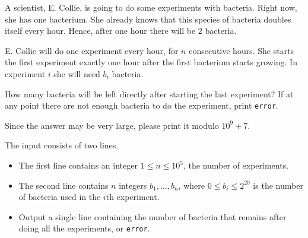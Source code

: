 

\newcommand{\modval}{10^9+7}
\newcommand{\maxn}{10^5}
\newcommand{\maxb}{2^{20}}
\newcommand{\errormessage}{error}

A scientist, E. Collie, is going to do some experiments with bacteria.
Right now, she has one bacterium.
She already knows that this species of bacteria doubles itself every hour.
Hence, after one hour there will be $2$ bacteria.

E. Collie will do one experiment every hour, for $n$ consecutive hours.
She starts the first experiment exactly one hour after the first bacterium starts growing.
In experiment $i$ she will need $b_i$ bacteria.

How many bacteria will be left directly after starting the last experiment?
If at any point there are not enough bacteria to do the experiment, print \texttt{\errormessage}.

Since the answer may be very large, please print it modulo $\modval$.

\begin{Input}
	The input consists of two lines.
	\begin{itemize}
		\item The first line contains an integer $1\leq n\leq \maxn$, the number of experiments.
		\item The second line contains $n$ integers $b_1,\dots,b_n$, where $0\leq b_i\leq \maxb$ is
			the number of bacteria used in the $i$th experiment.
	\end{itemize}
\end{Input}

\begin{Output}
\begin{itemize}\item
	Output a single line containing the number of bacteria that remains after doing all the experiments, or
	\texttt{\errormessage}.
\end{itemize}
\end{Output}
